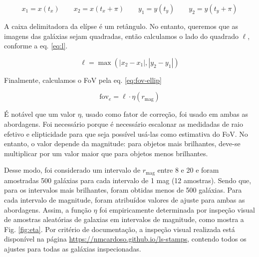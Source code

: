 \begin{equation}\label{eq:bb}
  x_1 = x(t_x) \qquad x_2 = x(t_x + \pi) \qquad y_1 = y(t_y) \qquad y_2 = y(t_y + \pi)
\end{equation}

A caixa delimitadora da elípse é um retângulo. No entanto, queremos que as imagens das galáxias sejam quadradas, então calculamos o lado do quadrado $\ell$, conforme a eq. \eqref{eq:l}.

\begin{equation}\label{eq:l}
  \ell = \max(|x_2 - x_1|, |y_2 - y_1|)
\end{equation}

Finalmente, calculamos o FoV pela eq. \eqref{eq:fov-ellip}

\begin{equation}\label{eq:fov-ellip}
  \mathrm{fov}_e = \ell \cdot \eta(r_{\mathrm{mag}})
\end{equation}

É notável que um valor $\eta$, usado como fator de correção, foi usado em ambas as abordagens. Foi necessário porque é necessário escalonar as medidadas de raio efetivo e elipticidade para que seja possível usá-las como estimativa do FoV. No entanto, o valor depende da magnitude: para objetos mais brilhantes, deve-se multiplicar por um valor maior que para objetos menos brilhantes.

Desse modo, foi considerado um intervalo de $r_{\mathrm{mag}}$ entre 8 e 20 e foram amostradas 500 galáxias para cada intervalo de 1 mag (12 amostras). Sendo que, para os intervalos mais brilhantes, foram obtidas menos de 500 galáxias. Para cada intervalo de magnitude, foram atribuídos valores de ajuste para ambas as abordagens. Assim, a função $\eta$ foi empiricamente determinada por inspeção visual de amostras aleatórias de galaxias em intervalos de magnitude, como mostra a Fig. \ref{fig:eta}. Por critério de documentação, a inspeção visual realizada está disponível na página \url{https://nmcardoso.github.io/ls-stamps}, contendo todos os ajustes para todas as galáxias inspecionadas.

